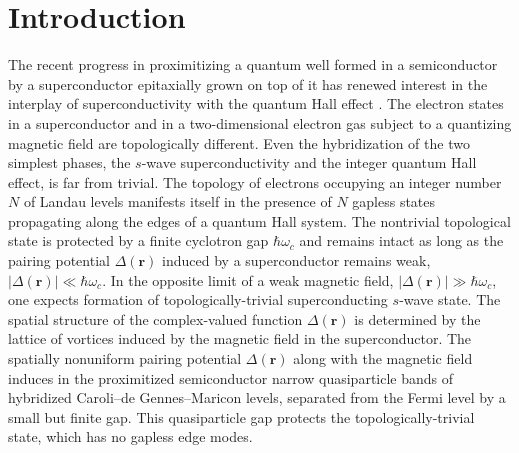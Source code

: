 \documentclass[10pt,prb,aps,superscriptaddress,amsmath,amssymb,twocolumn,floatfix,longbibliography]{revtex4-1}
\begin{document}
\section{Introduction}
The recent progress in proximitizing a quantum well formed in a semiconductor by a superconductor epitaxially grown on top of it has renewed interest in the interplay of superconductivity with the quantum Hall effect \cite{MakingSwaveTopological,  McDonald_new,  MishmashYazdaniZaletel, Jain2022helical}. The electron states in a superconductor and in a two-dimensional electron gas subject to a quantizing magnetic field are topologically different. 
Even the hybridization of the two simplest phases, the $s$-wave superconductivity and the integer quantum Hall effect, is far from trivial. The topology of electrons occupying an integer number $N$ of Landau levels manifests itself in the presence of $N$ gapless states propagating along the edges of a quantum Hall system. The nontrivial topological state is protected by a finite cyclotron gap $\hbar\omega_c$ and remains intact as long as the pairing potential $\Delta(\mathbf r)$ induced by a superconductor remains weak, $|\Delta(\mathbf r)|\ll \hbar\omega_c$. In the opposite limit of a weak magnetic field, $|\Delta(\mathbf r)|\gg \hbar\omega_c$, one expects formation of topologically-trivial superconducting $s$-wave state. The spatial structure of the complex-valued function $\Delta(\mathbf r)$ is determined by the lattice of vortices induced by the magnetic field in the superconductor\cite{Abrikosov_vortex_lattice}. The spatially nonuniform pairing potential $\Delta(\mathbf r)$ along with the magnetic field induces in the proximitized semiconductor narrow quasiparticle bands \cite{Franz-Tesanovic, Liu-Franz} of hybridized Caroli--de Gennes--Maricon levels\cite{CdGM}, separated from the Fermi level by a small but finite gap. This quasiparticle gap protects the topologically-trivial state, which has no gapless edge modes.
\end{document}
